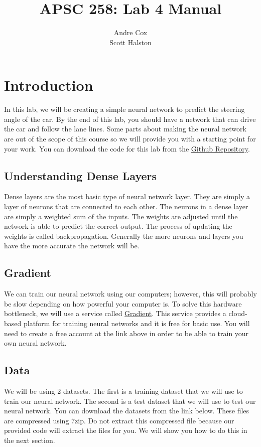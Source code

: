 \documentclass[11pt]{report}
\title{APSC 258: Lab 4 Manual}
\author{Andre Cox \\ Scott Halston}
\begin{document}
\maketitle
\tableofcontents

\clearpage

\chapter{Introduction}
In this lab, we will be creating a simple neural network to predict the steering angle of the car.
By the end of this lab, you should have a network that can drive the car and follow the lane lines. Some parts about making the neural network are out of the scope of this course so we will provide you with a starting point for your work. You can download the code for this lab from the 
\href{https://github.com/PiCarV/Demos}{Github Repository}.

\section{Understanding Dense Layers}
Dense layers are the most basic type of neural network layer. They are simply a layer of neurons that are connected to each other. The neurons in a dense layer are simply a weighted sum of the inputs. The weights are adjusted until the network is able to predict the correct output. The process of updating the weights is called backpropagation. Generally the more neurons and layers you have the more accurate the network will be. 

\section{Gradient}
We can train our neural network using our computers; however, this will probably be slow depending on how powerful your computer is. To solve this hardware bottleneck, we will use a service called \href{https://www.gradient.run/}{Gradient}. This service provides a cloud-based platform for training neural networks and it is free for basic use. You will need to create a free account at the link above in order to be able to train your own neural network.

\section{Data}
We will be using 2 datasets. The first is a training dataset that we will use to train our neural network. The second is a test dataset that we will use to test our neural network. You can download the datasets from the link below. These files are compressed using 7zip. Do not extract this compressed file because our provided code will extract the files for you. We will show you how to do this in the next section.
\end{document}
